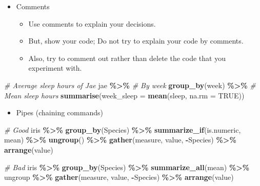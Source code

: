 \documentclass[
]{book}
\newenvironment{Shaded}{\begin{snugshade}}{\end{snugshade}}
\newcommand{\CommentTok}[1]{\textcolor[rgb]{0.56,0.35,0.01}{\textit{#1}}}
\newcommand{\DataTypeTok}[1]{\textcolor[rgb]{0.13,0.29,0.53}{#1}}
\newcommand{\KeywordTok}[1]{\textcolor[rgb]{0.13,0.29,0.53}{\textbf{#1}}}
\newcommand{\NormalTok}[1]{#1}
\newcommand{\OperatorTok}[1]{\textcolor[rgb]{0.81,0.36,0.00}{\textbf{#1}}}
\newcommand{\OtherTok}[1]{\textcolor[rgb]{0.56,0.35,0.01}{#1}}
\newcommand{\StringTok}[1]{\textcolor[rgb]{0.31,0.60,0.02}{#1}}
\providecommand{\tightlist}{%
  \setlength{\itemsep}{0pt}\setlength{\parskip}{0pt}}
\begin{document}
\begin{itemize}
\tightlist
\item
  Comments

  \begin{itemize}
  \tightlist
  \item
    Use comments to explain your decisions.
  \item
    But, show your code; Do not try to explain your code by comments.
  \item
    Also, try to comment out rather than delete the code that you experiment with.
  \end{itemize}
\end{itemize}

\begin{Shaded}
\begin{Highlighting}[]
\CommentTok{\# Average sleep hours of Jae}
\NormalTok{jae }\OperatorTok{\%\textgreater{}\%}
\StringTok{  }\CommentTok{\# By week}
\StringTok{  }\KeywordTok{group\_by}\NormalTok{(week) }\OperatorTok{\%\textgreater{}\%}
\StringTok{  }\CommentTok{\# Mean sleep hours }
\StringTok{  }\KeywordTok{summarise}\NormalTok{(}\DataTypeTok{week\_sleep =} \KeywordTok{mean}\NormalTok{(sleep, }\DataTypeTok{na.rm =} \OtherTok{TRUE}\NormalTok{))}
\end{Highlighting}
\end{Shaded}

\begin{itemize}
\tightlist
\item
  Pipes (chaining commands)
\end{itemize}

\begin{Shaded}
\begin{Highlighting}[]
\CommentTok{\# Good}
\NormalTok{iris }\OperatorTok{\%\textgreater{}\%}
\StringTok{  }\KeywordTok{group\_by}\NormalTok{(Species) }\OperatorTok{\%\textgreater{}\%}
\StringTok{  }\KeywordTok{summarize\_if}\NormalTok{(is.numeric, mean) }\OperatorTok{\%\textgreater{}\%}
\StringTok{  }\KeywordTok{ungroup}\NormalTok{() }\OperatorTok{\%\textgreater{}\%}
\StringTok{  }\KeywordTok{gather}\NormalTok{(measure, value, }\OperatorTok{{-}}\NormalTok{Species) }\OperatorTok{\%\textgreater{}\%}
\StringTok{  }\KeywordTok{arrange}\NormalTok{(value)}

\CommentTok{\# Bad}
\NormalTok{iris }\OperatorTok{\%\textgreater{}\%}\StringTok{ }\KeywordTok{group\_by}\NormalTok{(Species) }\OperatorTok{\%\textgreater{}\%}\StringTok{ }\KeywordTok{summarize\_all}\NormalTok{(mean) }\OperatorTok{\%\textgreater{}\%}
\NormalTok{ungroup }\OperatorTok{\%\textgreater{}\%}\StringTok{ }\KeywordTok{gather}\NormalTok{(measure, value, }\OperatorTok{{-}}\NormalTok{Species) }\OperatorTok{\%\textgreater{}\%}
\KeywordTok{arrange}\NormalTok{(value)}
\end{Highlighting}
\end{Shaded}
\end{document}
